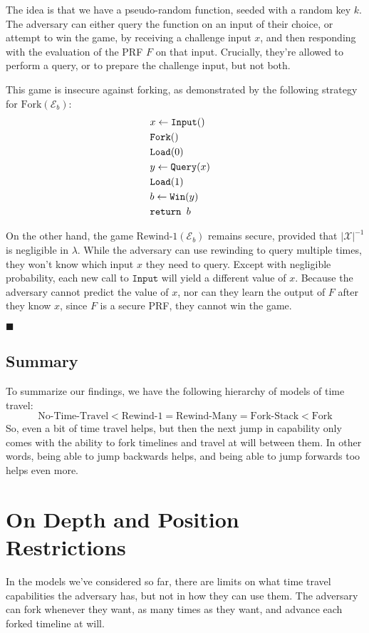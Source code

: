 The idea is that we have a pseudo-random function, seeded with
a random key $k$.
The adversary can either query the function on an input of their choice,
or attempt to win the game, by receiving a challenge input $x$,
and then responding with the evaluation of the PRF $F$ on that input.
Crucially, they're allowed to perform a query, or to prepare
the challenge input, but not both.

This game is insecure against forking, as demonstrated by the following
strategy for $\text{Fork}(\mathcal{E}_b)$:
$$
\begin{aligned}
&x \gets \texttt{Input}()\cr
&\texttt{Fork}()\cr
&\texttt{Load}(0)\cr
&y \gets \texttt{Query}(x)\cr
&\texttt{Load}(1)\cr
&b \gets \texttt{Win}(y)\cr
&\texttt{return } b
\end{aligned}
$$

On the other hand, the game $\text{Rewind-1}(\mathcal{E}_b)$ remains
secure, provided that $|\mathcal{X}|^{-1}$ is negligible in $\lambda$.
While the adversary can use rewinding to query multiple times,
they won't know which input $x$ they need to query.
Except with negligible probability, each new call to $\texttt{Input}$
will yield a different value of $x$.
Because the adversary cannot predict the value of $x$, nor can they
learn the output of $F$ after they know $x$, since $F$ is a secure
PRF, they cannot win the game.

$\blacksquare$

\subsection{Summary}

To summarize our findings, we have the following hierarchy of models
of time travel:
$$
\text{No-Time-Travel} < \text{Rewind-1} = \text{Rewind-Many} = \text{Fork-Stack} < \text{Fork}
$$
So, even a bit of time travel helps, but then the next jump in capability
only comes with the ability to fork timelines and travel at will between them.
In other words, being able to jump backwards helps, and being able to jump
forwards too helps even more.

\section{On Depth and Position Restrictions}
\label{sec:restriction}

In the models we've considered so far, there are limits on what time travel capabilities
the adversary has, but not in how they can use them.
The adversary can fork whenever they want, as many times as they want,
and advance each forked timeline at will.


